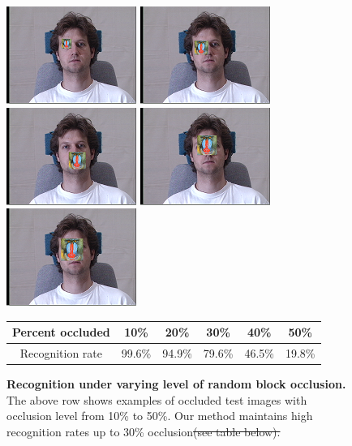 \documentclass[12pt,journal,draftcls,letterpaper,onecolumn]{IEEEtran}
\providecommand{\DIFadd}[1]{{\protect\color{blue}\uwave{#1}}} %
\providecommand{\DIFdel}[1]{{\protect\color{red}\sout{#1}}}                      %
\providecommand{\DIFaddFL}[1]{\DIFadd{#1}} %
\providecommand{\DIFdelFL}[1]{\DIFdel{#1}} %
\providecommand{\DIFaddbeginFL}{} %
\providecommand{\DIFaddendFL}{} %
\providecommand{\DIFdelbeginFL}{} %
\providecommand{\DIFdelendFL}{} %
\begin{document}
\begin{figure}[t]
\centering
\includegraphics[scale=0.75,clip=true]{figures_pami/multipie_occ/occ10.png}
\includegraphics[scale=0.75,clip=true]{figures_pami/multipie_occ/occ20.png}
\includegraphics[scale=0.75,clip=true]{figures_pami/multipie_occ/occ30.png}
\includegraphics[scale=0.75,clip=true]{figures_pami/multipie_occ/occ40.png}
\includegraphics[scale=0.75,clip=true]{figures_pami/multipie_occ/occ50.png}
\DIFaddbeginFL \vspace{-.5in}
\DIFaddendFL \caption{{\bf Recognition under varying level of
random block occlusion.} The above row shows examples of occluded test images with occlusion level from 10\% to 50\%. Our method maintains high recognition rates up to 30\% occlusion\DIFdelbeginFL \DIFdelFL{(see table below). }\DIFdelendFL \DIFaddbeginFL \DIFaddFL{:}\DIFaddendFL } \DIFaddbeginFL \vspace{1mm}
{\small
\DIFaddendFL \begin{tabular}{|c|c|c|c|c|c| }
\hline
Percent occluded & 10\% & 20\% & 30\% & 40\% & 50\%  \\
\hline
\hline
Recognition rate & 99.6\% & 94.9\% & 79.6\% & 46.5\% & 19.8\% \\
\hline
\end{tabular}
\DIFaddbeginFL }
\DIFaddendFL \label{fig:multipie-occ-rec}
\vspace{-.5in}
\end{figure}
\end{document}
